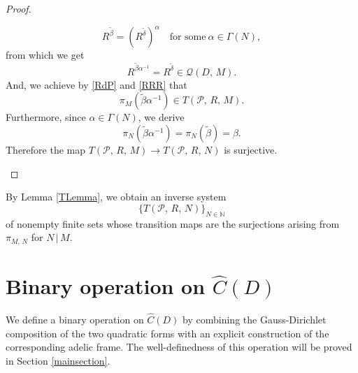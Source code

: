 \documentclass[reqno,11pt]{article}
\theoremstyle{plain} %
\theoremstyle{definition} %
\begin{document}
\begin{proof}
\begin{enumerate}
\begin{equation*}
R^{\widetilde{\beta}}=(R^{\widetilde{\delta}})^\alpha\quad\text{for some}~
\alpha\in\Gamma(N),
\end{equation*}
from which we get 
\begin{equation}\label{RRR}
R^{\widetilde{\beta}\alpha^{-1}}=R^{\widetilde{\delta}}\in\mathcal{Q}(D,\,M).
\end{equation}
And, we achieve by \eqref{RdP} and \eqref{RRR} that
\begin{equation*}
\pi_M(\widetilde{\beta}\alpha^{-1})\in T(\mathcal{P},\,R,\,M). 
\end{equation*}
Furthermore, since $\alpha\in\Gamma(N)$, we derive
\begin{equation*}
\pi_N(\widetilde{\beta}\alpha^{-1})=\pi_N(\widetilde{\beta})=\beta. 
\end{equation*}
Therefore the map $T(\mathcal{P},\,R,\,M)\rightarrow T(\mathcal{P},\,R,\,N)$
is surjective. 
\end{enumerate}
\end{proof}

By Lemma \ref{TLemma}, we obtain an inverse system
\begin{equation*}
\{T(\mathcal{P},\,R,\,N)\}_{N\in\mathbb{N}}
\end{equation*}
of nonempty finite sets whose transition maps
are the surjections arising from $\pi_{M,\,N}$
for $N\,|\,M$. 

\section {Binary operation on $\widehat{C}(D)$}\label{binaryoperation}

We define a binary operation on $\widehat{C}(D)$ 
by combining the Gauss-Dirichlet composition of the two quadratic forms 
with an explicit construction of the corresponding adelic frame. 
The well-definedness of this operation will be proved in Section \ref{mainsection}.
\end{document}
